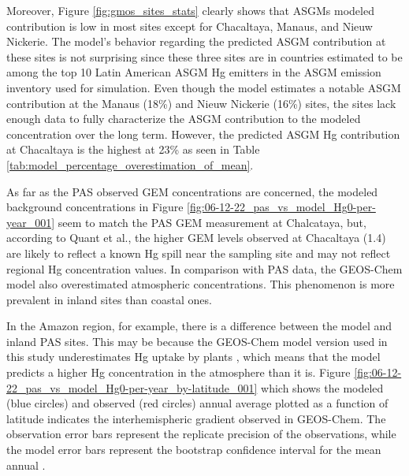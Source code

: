 \begin{flushleft}
Moreover, Figure \ref{fig:gmos_sites_stats} clearly shows that ASGMs modeled contribution is low in most sites except for Chacaltaya, Manaus, and Nieuw Nickerie. The model's behavior regarding the predicted ASGM contribution at these sites is not surprising since these three sites are in countries estimated to be among the top 10 Latin American ASGM Hg emitters in the ASGM emission inventory used for \gc simulation. Even though the model estimates a notable ASGM contribution at the Manaus (18\%) and Nieuw Nickerie (16\%) sites, the sites lack enough data to fully characterize the ASGM contribution to the modeled \hg concentration over the long term. However, the predicted  ASGM Hg contribution at Chacaltaya is the highest at 23\% as seen in Table \ref{tab:model_percentage_overestimation_of_mean}. 
\end{flushleft}
\newpage
\begin{flushleft}
 As far as the PAS observed GEM concentrations are concerned, the modeled background \hg concentrations in Figure \ref{fig:06-12-22_pas_vs_model_Hg0-per-year_001} seem to match the PAS GEM measurement at Chalcataya, but, according to Quant et al.\cite{quant_measuring_2021}, the higher GEM levels observed at Chacaltaya (1.4\nang) are likely to reflect a known Hg spill near the sampling site and may not reflect regional Hg concentration values. In comparison with PAS data, the GEOS-Chem model also overestimated atmospheric concentrations. This phenomenon is more prevalent in inland sites than coastal ones. 
 
 \end{flushleft}

\begin{flushleft}
 In the Amazon region, for example, there is a difference between the model and inland PAS sites. This may be because the GEOS-Chem model version used in this study underestimates Hg uptake by plants \cite{feinberg_evaluating_2022}, which means that the model predicts a higher Hg concentration in the atmosphere than it is. Figure \ref{fig:06-12-22_pas_vs_model_Hg0-per-year_by-latitude_001} which shows the modeled (blue circles) and observed (red circles) annual average \hg plotted as a function of latitude indicates the interhemispheric gradient observed in GEOS-Chem. The observation error bars represent the replicate precision of the observations, while the model error bars represent the \nft bootstrap confidence interval for the mean annual \hg. 
\end{flushleft}
 
